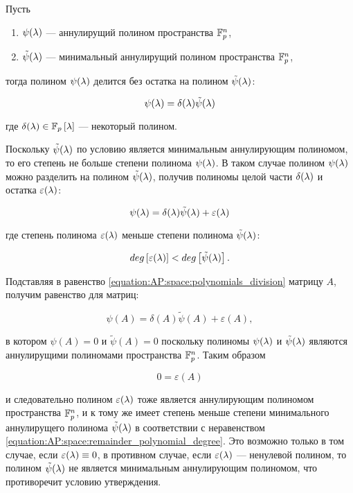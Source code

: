 \begin{statement} \label{statement:AP:space:polynomials_division}
	Пусть
	\begin{enumerate}
		\item $\psi (\lambda)$ --- аннулирущий полином пространства $\mathbb{F}^{n}_p$,
		\item $\tilde\psi (\lambda)$ --- минимальный аннулирущий полином пространства $\mathbb{F}^{n}_p$,
	\end{enumerate}
	тогда полином $\psi (\lambda)$ делится без остатка на полином $\tilde \psi (\lambda)$:

		$$ \psi (\lambda) = \delta (\lambda) \tilde\psi (\lambda) $$

	где $\delta (\lambda) \in \mathbb{F}_p \left [ \lambda \right ]$ --- некоторый полином.

	\proof

	Поскольку $\tilde\psi (\lambda)$ по условию является минимальным аннулирующим полиномом, то его степень не больше степени полинома
	$\psi (\lambda)$. В таком случае полином $\psi (\lambda)$ можно разделить на полином $\tilde\psi (\lambda)$, получив полиномы
	целой части $\delta (\lambda)$ и остатка $\varepsilon (\lambda)$:

		\begin{equation} \label{equation:AP:space:polynomials_division}
			\psi (\lambda) = \delta (\lambda) \tilde \psi (\lambda) + \varepsilon (\lambda)
		\end{equation}

	где степень полинома $\varepsilon (\lambda)$ меньше степени полинома $\tilde\psi (\lambda)$:

		\begin{equation} \label{equation:AP:space:remainder_polynomial_degree}
			deg \left [ \varepsilon (\lambda) \right ] < deg \left [ \tilde\psi (\lambda) \right ].
		\end{equation}

	Подставляя в равенство \eqref{equation:AP:space:polynomials_division} матрицу $A$, получим равенство для матриц:

		$$ \psi(A) = \delta(A) \tilde\psi(A) + \varepsilon(A), $$

	в котором $\psi(A) = 0$ и $\tilde\psi(A) = 0$ поскольку полиномы $\psi (\lambda)$ и $\tilde\psi (\lambda)$ являются аннулирущими
	полиномами пространства $\mathbb{F}^{n}_p$. Таким образом

		$$ 0 = \varepsilon(A) $$

	и следовательно полином $\varepsilon (\lambda)$ тоже является аннулирующим полиномом пространства $\mathbb{F}^{n}_p$, и к тому же имеет
	степень меньше степени минимального аннулирущего полинома $\tilde\psi (\lambda)$ в соответствии с неравенством
	\eqref{equation:AP:space:remainder_polynomial_degree}. Это возможно только в том случае, если $\varepsilon (\lambda) \equiv 0$, в
	противном случае, если $\varepsilon (\lambda)$ --- ненулевой полином, то полином $\tilde\psi (\lambda)$ не является минимальным
	аннулирующим полиномом, что противоречит условию утверждения.


\end{statement}
